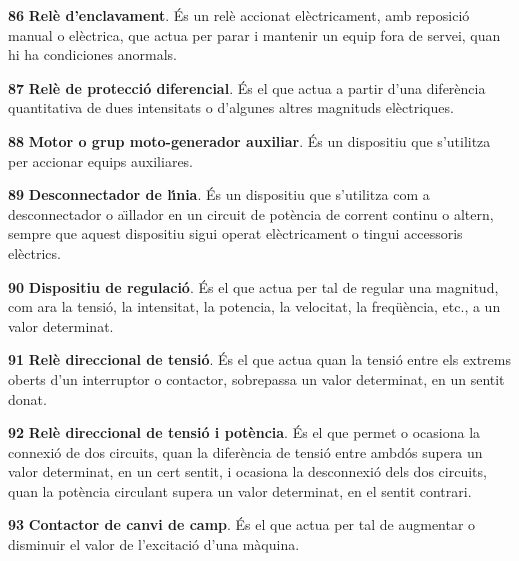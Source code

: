 \begin{multicols}{2}
\begin{list}{}
\item[\textbf{86}]  \textbf{Rel\`{e} d'enclavament}. \'{E}s un rel\`{e}
accionat el\`{e}ctricament, amb reposici\'{o} manual o el\`{e}ctrica, que actua
per parar i mantenir un equip fora de servei, quan hi ha condiciones
anormals.

\item[\textbf{87}]  \textbf{Rel\`{e} de protecci\'{o}
diferencial}. \'{E}s el que actua a partir d'una  difer\`{e}ncia quantitativa de dues intensitats
o d'algunes altres magnituds el\`{e}ctriques.

\item[\textbf{88}]  \textbf{Motor o grup
moto-generador auxiliar}. \'{E}s un dispositiu que s'utilitza per
accionar equips auxiliares.

\item[\textbf{89}]  \textbf{Desconnectador de l\'{\i}nia}. \'{E}s
un dispositiu que s'utilitza com a desconnectador o a\"{\i}llador en un
circuit de pot\`{e}ncia de corrent continu o altern, sempre que aquest
dispositiu sigui operat el\`{e}ctricament o tingui accessoris el\`{e}ctrics.

\item[\textbf{90}]  \textbf{Dispositiu de regulaci\'{o}}. \'{E}s el que
actua per tal de regular una magnitud, com ara la tensi\'{o}, la intensitat, la potencia,
la velocitat, la freq\"{u}\`{e}ncia, etc., a un valor determinat.

\item[\textbf{91}]  \textbf{Rel\`{e} direccional de tensi\'{o}}.
\'{E}s el que actua quan la tensi\'{o} entre els extrems oberts d'un
interruptor o contactor, sobrepassa un valor determinat, en un
sentit donat.

\item[\textbf{92}]  \textbf{Rel\`{e} direccional
de tensi\'{o} i pot\`{e}ncia}. \'{E}s el que permet o ocasiona la connexi\'{o} de
dos circuits, quan la difer\`{e}ncia de tensi\'{o} entre ambd\'{o}s supera un
valor determinat, en un cert sentit, i ocasiona la desconnexi\'{o} dels
dos circuits, quan la pot\`{e}ncia circulant supera un valor determinat,
en el sentit contrari.

\item[\textbf{93}]  \textbf{Contactor de canvi de camp}. \'{E}s el
que actua per tal de augmentar o disminuir el valor de l'excitaci\'{o}
d'una m\`{a}quina.


\end{list}
\end{multicols}

